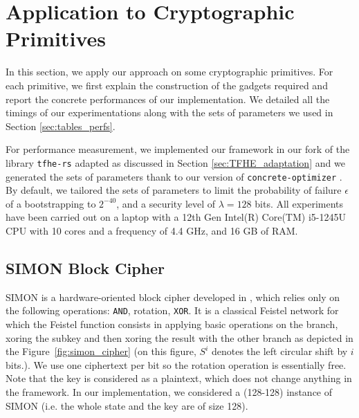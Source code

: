 
\section{Application to Cryptographic Primitives}
\label{sec:implementations}


In this section, we apply our approach on some cryptographic primitives. For each primitive, we first explain the construction of the gadgets required and report the concrete performances of our implementation. We detailed all the timings of our experimentations along with the sets of parameters we used in Section \ref{sec:tables_perfs}.

For performance measurement, we implemented our framework in our fork of the library \texttt{tfhe-rs} \cite{tfhe-rs} adapted as discussed in Section \ref{sec:TFHE_adaptation} and we generated the sets of parameters thank to our version of \texttt{concrete-optimizer} \cite{concrete-optimizer}. By default, we tailored the sets of parameters to limit the probability of failure $\epsilon$ of a bootstrapping to $2^{-40}$, and a security level of $\lambda = 128$ bits. All experiments have been carried out on a laptop with a 12th Gen Intel(R) Core(TM) i5-1245U CPU with 10 cores and a frequency of 4.4 GHz, and 16 GB of RAM.


\subsection{SIMON Block Cipher}
\label{sec:simon}

SIMON is a hardware-oriented block cipher developed in \cite{SIMON}, which relies only on the following operations: \texttt{AND}, rotation, \texttt{XOR}. It is a classical Feistel network for which the Feistel function consists in applying basic operations on the branch, xoring the subkey and then xoring the result with the other branch as depicted in the Figure~\ref{fig:simon_cipher} (on this figure, $S^i$ denotes the left circular shift by $i$ bits.). We use one ciphertext per bit so the rotation operation is essentially free. Note that the key is considered as a plaintext, which does not change anything in the framework. In our implementation, we considered a (128-128) instance of SIMON (i.e. the whole state and the key are of size 128). 


% 

